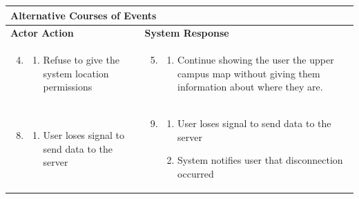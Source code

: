 \begin{longtable}{|p{}|p{}|}\hline
	\multicolumn{2}{|p{1.095\textwidth}|}{\textbf{Alternative Courses of Events}} \\\hline
	\textbf{Actor Action} & \textbf{System Response} \\\hline
	\begin{enumerate}
		\setcounter{enumi}{3}
		\item 
		\begin{enumerate}[series=abnormal0]
			\item Refuse to give the system location permissions
		\end{enumerate}
	\end{enumerate}
	&
	\begin{enumerate}[series=abnormal0]
		\setcounter{enumi}{4}
		\item
		\begin{enumerate}
			\item Continue showing the user the upper campus map without giving them information about where they are. 
		\end{enumerate}
	\end{enumerate} \\\hline
	\begin{enumerate}
		\setcounter{enumi}{7}
		\item 
		\begin{enumerate}[series=abnormal1]
			\item User loses signal to send data to the server
		\end{enumerate}
	\end{enumerate}
	&
	\begin{enumerate}
		\setcounter{enumi}{8}
		\item 
		\begin{enumerate}
			\item User loses signal to send data to the server
			\item System notifies user that disconnection occurred
		\end{enumerate}
	\end{enumerate} \\\hline
\end{longtable}
